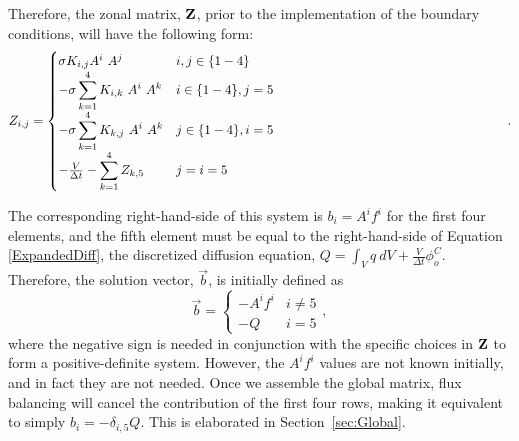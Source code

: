 \documentclass[11pt,letterpaper,oneside,notitlepage]{article}	%
\newcommand{\eq}[1]{Equation \eqref{#1}}		%
\numberwithin{equation}{section}				%
\begin{document}
Therefore, the zonal matrix, $\bf Z$, prior to the implementation of the boundary conditions, will have the following form:
\begin{equation}  Z_{i,j}=\begin{cases}
\sigma K_{i,j} A^i\ A^j & i,j\in\{1-4\} \\\noalign{\:}
-\sigma\displaystyle\sum_{k=1}^4 K_{i,k}\ A^i\ A^k & i\in\{1-4\}, j=5 \\\noalign{\:}
-\sigma\displaystyle\sum_{k=1}^4 K_{k,j}\ A^i\ A^k  & j\in\{1-4\}, i=5  \\\noalign{\:}
-\frac{V}{\Delta t}-\displaystyle\sum_{k=1}^4 Z_{k,5}	& j=i=5
\end{cases}.\end{equation}

The corresponding right-hand-side of this system is $b_i=A^i f^i$ for the first four elements, and the fifth element must be equal to the right-hand-side of \eq{ExpandedDiff}, the discretized diffusion equation, $Q=\int_V q\ dV+\frac{V}{\Delta t}\phi^C_o$.  Therefore, the solution vector, $\vec b$, is initially defined as 
\[
\vec b = \begin{cases}
-A^i f^i	& i\neq5 \\
-Q		&i=5
\end{cases},\]
where the negative sign is needed in conjunction with the specific choices in $\bf Z$ to form a positive-definite system.  However, the $A^i f^i$ values are not known initially, and in fact they are not needed. Once we assemble the global matrix, flux balancing will cancel the contribution of the first four rows, making it equivalent to simply $b_i = -\delta_{i,5} Q$. This is elaborated in Section~\ref{sec:Global}.
\end{document}
